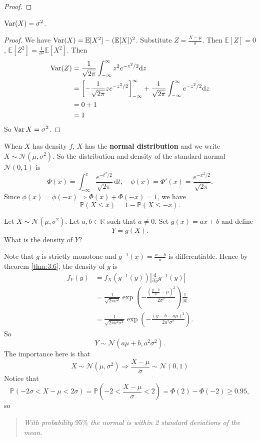\begin{example}
\begin{proof}
    \end{proof}
    \begin{proposition}
    $\operatorname{Var}(X) = \sigma^2$.
    \end{proposition}
    \begin{proof}
    We have $\operatorname{Var} (X) = \mathbb{E}[X^2] - (\mathbb{E}[X])^2$. Substitute $Z = \frac{X - \mu}{\sigma}$. Then $\mathbb{E}[Z] = 0$, $\mathbb{E}[Z^2] = \frac{1}{\sigma^2}\mathbb{E}[X^2]$. Then
    \begin{align*}
        \operatorname{Var}(Z) &= \frac{1}{\sqrt{2\pi}} \int_{-\infty}^\infty z^2 e^{-z^2/2}\dd z\\
        &= \left[-\frac{1}{\sqrt{2\pi}}ze^{-z^2/2}\right]_{-\infty}^\infty + \frac{1}{\sqrt{2\pi}}\int_{-\infty}^\infty e^{-z^2/2}\dd z\\
        &= 0 + 1\\
        &= 1
    \end{align*}
    So $\operatorname{Var} X = \sigma^2$.
    \end{proof}
    When $X$ has density $ f $, $X$ has the \textbf{normal distribution} and we write $ X \sim \mathcal{N}(\mu,\sigma^2) $. So the distribution and density of the standard normal $ \mathcal{N}(0,1) $ is
    \[
        \Phi(x)=\int_{-\infty}^x\frac{e^{-t^2/2}}{\sqrt{2\pi}}\,\mathrm dt,\quad\phi(x)=\Phi'(x)=\frac{e^{-x^2/2}}{\sqrt{2\pi}}.
    \]
    Since $ \phi(x)=\phi(-x) \Rightarrow \Phi(x)+\Phi(-x)=1 $, we have 
    \[
        \mathbb{P}(X\le x)=1-\mathbb{P}(X\le -x).
    \]
\end{example}

\begin{example}
    Let $ X \sim \mathcal{N}( \mu,\sigma^2) $. Let $ a,b\in \mathbb{R} $ such that $ a\neq 0 $. Set $ g(x)=ax+b $ and define 
    \[
        Y= g(X).
    \]
    What is the density of $Y$?

    Note that $g$ is strictly monotone and $ g^{-1}(x)=\frac{x-b}{a} $ is differentiable. Hence by theorem \ref{thm:3.6}, the density of $y$ is 
    \begin{align*}
        f_Y(y)&= f_X(g^{-1}(y)) \left| \frac{\mathrm{d}}{\mathrm{d}y} g^{-1}(y)  \right| \\ 
        &= \frac{1}{\sqrt{2\pi\sigma^2}}\exp\left(-\frac{(\frac{y-b}{a} - \mu)^2}{2\sigma^2}\right) \frac{1}{|a|}\\ 
        &= \frac{1}{\sqrt{2\pi a^2\sigma^2}} \exp \left( -\frac{(y-b - a\mu)^2}{2a^2\sigma^2} \right).
    \end{align*}
    So 
    \[
        Y \sim \mathcal{N}\left( a\mu+b, a^2\sigma ^2 \right).
    \]
    The importance here is that 
    \[
        \boxed{X \sim \mathcal{N}(\mu,\sigma^2) \Longrightarrow \frac{X-\mu}{\sigma}\sim \mathcal{N}(0,1)}
    \]
    Notice that 
    \[
        \mathbb{P}(-2\sigma<X-\mu<2\sigma)=\mathbb{P}\left( -2<\frac{X-\mu}{\sigma}<2 \right)=\Phi(2)-\Phi(-2)\ge 0.95,
    \]
    so 
    \begin{quote}
        \textit{With probability $ 95\% $ the normal is within 2 standard deviations of the mean.}
    \end{quote}
\end{example}
